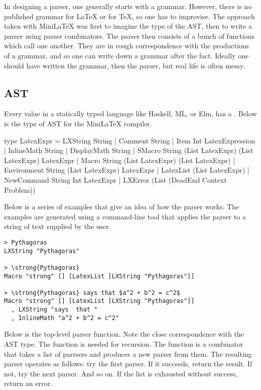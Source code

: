 In designing a parser, one generally starts with a grammar.  However, there is no published grammar for LaTeX or for TeX, so one has to improvise.  The approach taken with MiniLaTeX was first to imagine the type of the AST, then to write a parser using parser combinators.  The parser then consists of a bunch of functions which call one another.  They are in rough correspondence with the productions of a grammar, and so one can write down a grammar after the fact. Ideally one should have written the grammar, then the parser, but real life is often messy.

\subsection{AST}

Every value in a statically typed language like Haskell, ML, or Elm, has a .  Below is the type of AST for the MiniLaTeX compiler.

\begin{listing}
type LatexExpr
    = LXString String
    | Comment String
    | Item Int LatexExpression
    | InlineMath String
    | DisplayMath String
    | SMacro String (List LatexExpr) (List LatexExpr) LatexExpr
    | Macro String (List LatexExpr) (List LatexExpr)
    | Environment String (List LatexExpr) LatexExpr
    | LatexList (List LatexExpr)
    | NewCommand String Int LatexExpr
    | LXError (List (DeadEnd Context Problem))
\end{listing}

Below is a series of examples that give an idea of how the parser works.  The examples are generated using a command-line tool that applies the parser to a string of text supplied by the user.

\begin{verbatim}
> Pythagoras
LXString "Pythagoras"

> \strong{Pythagoras}
Macro "strong" [] [LatexList [LXString "Pythagoras"]]

> \strong{Pythagoras} says that $a^2 + b^2 = c^2$
Macro "strong" [] [LatexList [LXString "Pythagoras"]]
  , LXString "says  that "
  , InlineMath "a^2 + b^2 = c^2"
\end{verbatim}


Below is the top-level parser function.  Note the close correspondence
with the AST type.  The  function is needed for recursion.  The  function is a combinator that takes a list of parrsers and produces a new parser from them.  The resulting parser operates as follows: try the first parser.  If it succeeds, return the result.  If not, try the next parser.  And so on.  If the list is exhausted without success, return an error.

